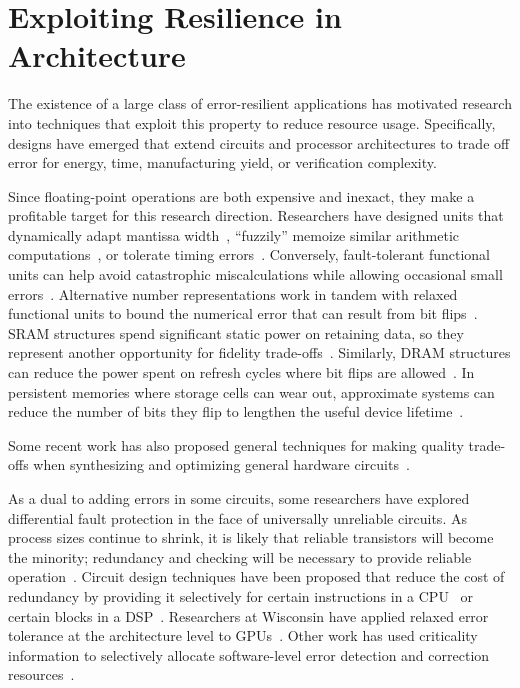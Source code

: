 \section{Exploiting Resilience in Architecture}

The existence of a large class of error-resilient applications has motivated
research into techniques that exploit this property to reduce resource usage.
Specifically, designs have emerged that extend circuits and processor
architectures to trade off error for energy, time, manufacturing yield, or
verification complexity.

Since floating-point operations are both expensive and inexact, they make a
profitable target for this research direction. Researchers have designed units
that dynamically adapt mantissa width~\cite{bitwidthred}, ``fuzzily'' memoize
similar arithmetic computations~\cite{fuzzymemo}, or tolerate timing
errors~\cite{palem-adders, impact, kumarhpca, hizli, adder-metrics}.
Conversely, fault-tolerant functional units can help avoid catastrophic
miscalculations while allowing occasional small errors~\cite{uva-adder}.
Alternative number
representations work in tandem with relaxed functional units to bound the
numerical error that can result from bit flips~\cite{stanleymarbell}. SRAM
structures spend significant static power on retaining data, so they represent
another opportunity for fidelity trade-offs~\cite{hybrid-sram}. Similarly,
DRAM structures can reduce the power spent on refresh cycles where bit flips
are allowed~\cite{flikker, sparkk}.
In persistent memories where storage cells can wear out, approximate systems
can reduce the number of bits they flip to lengthen the useful device
lifetime~\cite{fang-pcm}.

Some recent work has also proposed general techniques for making quality trade-offs
when synthesizing and optimizing general hardware
circuits~\cite{lossysynthesis, palem-pruning, rahimi, axilog, miao-thesis}.

As a dual to adding errors in some circuits, some researchers have
explored differential fault protection in the face of universally unreliable
circuits. As process sizes continue to shrink, it is likely that reliable
transistors will become the minority; redundancy and checking will be
necessary to provide reliable operation~\cite{li-asplos08}. Circuit design
techniques have been proposed that reduce the cost of redundancy by providing
it selectively for certain instructions in a CPU~\cite{wreft} or certain
blocks in a DSP~\cite{unequal-protection, ant}.
Researchers at Wisconsin have applied relaxed error tolerance at the
architecture level to GPUs~\cite{palframan-gpu}.
Other work has used criticality information to selectively allocate
software-level error detection and correction
resources~\cite{khudia-tolerance, shi-cal}.

